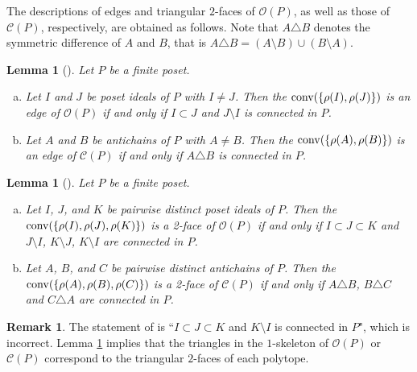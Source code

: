 \documentclass[12pt]{amsart}
\newtheorem{Lemma}[Theorem]{Lemma}
\theoremstyle{definition}
\newtheorem{Remark}[Theorem]{Remark}
\begin{document}
The descriptions of edges and triangular $2$-faces of ${\mathcal O}(P)$, as well as those of ${\mathcal C}(P)$, respectively, are obtained as follows.
Note that $A \triangle B$ denotes the symmetric difference of $A$ and $B$, that is $A \triangle B = (A \setminus B)\cup(B \setminus A)$.   

\begin{Lemma}[{\cite[Lemma 4, Lemma 5]{HL1}}]\label{edge}
Let $P$ be a finite poset.
\begin{enumerate}[(a)]
\item
Let $I$ and $J$ be poset ideals of $P$ with $I \neq J$. 
Then the ${\rm conv}(\{\rho(I),\rho(J)\})$ is an edge of ${\mathcal O}(P)$ if and only if $I \subset J$ and $J \setminus I$ is connected in $P$.
\item
 Let $A$ and $B$ be antichains of $P$ with $A \neq B$.
Then the ${\rm conv}(\{\rho(A),\rho(B)\})$ is an edge of ${\mathcal C}(P)$ if and only if $A \triangle B$ is connected in $P$.
\end{enumerate}
\end{Lemma}

\begin{Lemma}[{\cite[Theorem 1, Theorem 2]{M}}]\label{2-face}
Let $P$ be a finite poset.
\begin{enumerate}[(a)]
\item
Let $I$, $J$, and $K$ be pairwise distinct poset ideals of $P$. 
Then the ${\rm conv}(\{\rho(I), \rho(J), \rho(K)\})$ is a 2-face of $\mathcal{O}(P)$ if and only if $I \subset J \subset K$ and $J \setminus I$, $K \setminus J$, $K \setminus I$ are connected in $P$.
\item
 Let $A$, $B$, and $C$ be pairwise distinct antichains of $P$. 
Then the ${\rm conv}(\{\rho(A), \rho(B), \rho(C)\})$ is a 2-face of $\mathcal{C}(P)$ if and only if $A \triangle B$, $B \triangle C$ and $C \triangle A$ are connected in $P$.
\end{enumerate}
\end{Lemma}

\begin{Remark}
The statement of \cite[Theorem 1]{M} is ``$I \subset J \subset K$ and $K \setminus I$ is connected in $P$", which is incorrect. 
Lemma \ref{2-face} implies that the triangles in the $1$-skeleton of $\mathcal{O}(P)$ or $\mathcal{C}(P)$ correspond to the triangular $2$-faces of each polytope.
\end{Remark}


\end{document}
